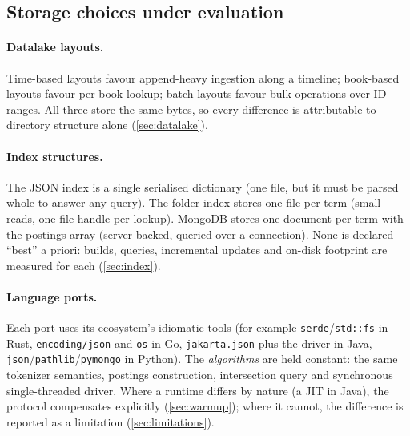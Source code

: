 \subsection{Storage choices under evaluation}
\label{sec:storage-choices}

\paragraph{Datalake layouts.}
Time-based layouts favour append-heavy ingestion along a timeline; book-based
layouts favour per-book lookup; batch layouts favour bulk operations over ID
ranges. All three store the same bytes, so every difference is attributable
to directory structure alone (\cref{sec:datalake}).

\paragraph{Index structures.}
The JSON index is a single serialised dictionary (one file, but it must be
parsed whole to answer any query). The folder index stores one file per term
(small reads, one file handle per lookup). MongoDB stores one document per
term with the postings array (server-backed, queried over a connection).
None is declared ``best'' a priori: builds, queries, incremental updates and
on-disk footprint are measured for each (\cref{sec:index}).

\paragraph{Language ports.}
Each port uses its ecosystem's idiomatic tools (for example
\texttt{serde}/\texttt{std::fs} in Rust, \texttt{encoding/json} and
\texttt{os} in Go, \texttt{jakarta.json} plus the driver in Java,
\texttt{json}/\allowbreak\texttt{pathlib}/\allowbreak\texttt{pymongo} in Python). The
\emph{algorithms} are held constant: the same tokenizer semantics, postings
construction, intersection query and synchronous single-threaded driver.
Where a runtime differs by nature (a JIT in Java), the protocol compensates
explicitly (\cref{sec:warmup}); where it cannot, the difference is reported
as a limitation (\cref{sec:limitations}).
